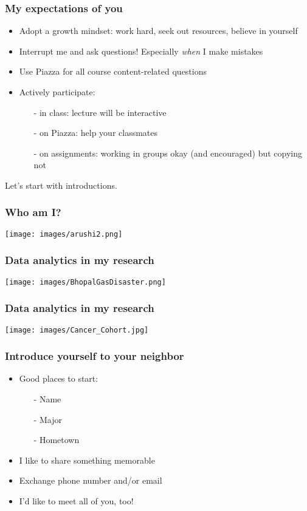 \documentclass[11pt]{beamer}
\begin{document}
\begin{frame}
\frametitle{My expectations of you}
\begin{itemize}
\item Adopt a \alert{growth mindset:} \uncover
{work hard, seek out resources, believe in yourself} \pause
\item \alert{Interrupt} me and ask questions! Especially \textit{when} I make mistakes \pause
\item Use \alert{Piazza} for all course content-related questions \pause
\item \alert{Actively participate}:
	\begin{itemize}
	\item[-] in class: lecture will be interactive
	\item[-] on Piazza: help your classmates
	\item[-] on assignments: working in groups okay (and encouraged) but copying not
	\end{itemize}
\end{itemize}
\bigskip
\pause
Let's start with introductions.
\end{frame}

\begin{frame}
\frametitle{Who am I?}
\begin{center}
 \texttt{[image: images/arushi2.png]} 
\end{center}
\end{frame}

\begin{frame}
\begin{center}
\frametitle{Data analytics in my research}
 \texttt{[image: images/BhopalGasDisaster.png]} 
\end{center}
\end{frame}


\begin{frame}
\begin{center}
\frametitle{Data analytics in my research}
 \texttt{[image: images/Cancer\_Cohort.jpg]} 
\end{center}
\end{frame}


\begin{frame}
\frametitle{Introduce yourself to your neighbor}
\begin{itemize}
\item Good places to start:
	\begin{itemize}
	\item[-] Name
	\item[-] Major
	\item[-] Hometown
	\end{itemize}
\item I like to share something \alert{memorable}
\item Exchange phone number and/or email 
\pause
\bigskip
\item I'd like to meet all of you, too!
\end{itemize}
\end{frame}
\end{document}
